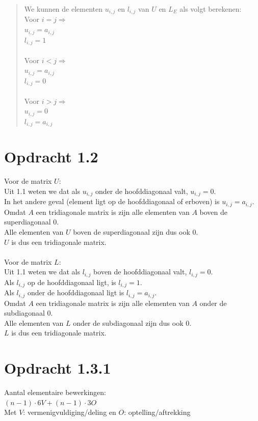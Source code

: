 \documentclass[a4paper]{article}
\begin{document}
\pagebreak
\begin{verse}
\begin{tabbing}
We kunnen de elementen $u_{i,j}$ en $ l_{i,j}$ van $U$ en $L_{E}$ als volgt berekenen:
\\Voor $i = j \Rightarrow$  \= 
\\ \>$u_{i,j} =  a_{i,j}$
\\ \>$l_{i,j} =  1$
\\{}
\\Voor $i < j \Rightarrow$
\\ \>$u_{i,j} =  a_{i,j}$
\\ \>$l_{i,j} =  0$
\\{}
\\Voor $i > j  \Rightarrow$ 
\\ \>$u_{i,j} =  0$
\\ \>$l_{i,j} =  a_{i,j}$
\end{tabbing}
\end{verse}
\section*{Opdracht 1.2}
Voor de matrix $U$:
\\Uit 1.1 weten we dat als $u_{i,j}$ onder de hoofddiagonaal valt, $u_{i,j} = 0$.
\\In het andere geval (element ligt op de hoofddiagonaal of erboven) is $u_{i,j} = a_{i,j}$.
\\Omdat $A$ een tridiagonale matrix is zijn alle elementen van $A$ boven de superdiagonaal $0$.
\\Alle elementen van $U$ boven de superdiagonaal zijn dus ook 0.
\\$U$ is dus een tridiagonale matrix.
\\{}
\\Voor de matrix $L$:
\\Uit 1.1 weten we dat als $l_{i,j}$ boven de hoofddiagonaal valt, $l_{i,j} = 0$.
\\Als $l_{i,j}$ op de hoofddiagonaal ligt, is $l_{i,j} = 1$.
\\Als $l_{i,j}$ onder de hoofddiagonaal ligt is $l_{i,j} = a_{i,j}$.
\\Omdat $A$ een tridiagonale matrix is zijn alle elementen van $A$ onder de subdiagonaal $0$.
\\Alle elementen van $L$ onder de subdiagonaal zijn dus ook 0.
\\$L$ is dus een tridiagonale matrix.
\section*{Opdracht 1.3.1}
Aantal elementaire bewerkingen:
\\$(n-1) \cdot 6V + (n-1) \cdot 3O$
\\Met $V$: vermenigvuldiging/deling en $O$: optelling/aftrekking
\end{document}
